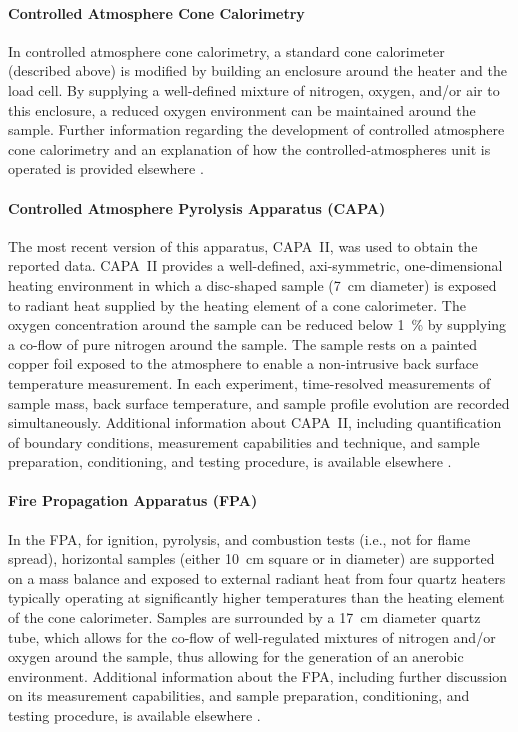 \documentclass{book}
\begin{document}
\paragraph{Controlled Atmosphere Cone Calorimetry}

In controlled atmosphere cone calorimetry, a standard cone calorimeter (described above) is modified by building an enclosure around the heater and the load cell. By supplying a well-defined mixture of nitrogen, oxygen, and/or air to this enclosure, a reduced oxygen environment can be maintained around the sample. Further information regarding the development of controlled atmosphere cone calorimetry and an explanation of how the controlled‐atmospheres unit is operated is provided elsewhere \cite{babrauskas1992cone}.

\paragraph{Controlled Atmosphere Pyrolysis Apparatus (CAPA)}

The most recent version of this apparatus, CAPA~II, was used to obtain the reported data. CAPA~II provides a well-defined, axi-symmetric, one-dimensional heating environment in which a disc-shaped sample (7~cm diameter) is exposed to radiant heat supplied by the heating element of a cone calorimeter. The oxygen concentration around the sample can be reduced below 1~\% by supplying a co-flow of pure nitrogen around the sample. The sample rests on a painted copper foil exposed to the atmosphere to enable a non-intrusive back surface temperature measurement. In each experiment, time-resolved measurements of sample mass, back surface temperature, and sample profile evolution are recorded simultaneously. Additional information about CAPA~II, including quantification of boundary conditions, measurement capabilities and technique, and sample preparation, conditioning, and testing procedure, is available elsewhere \cite{swann2017controlled}.

\paragraph{Fire Propagation Apparatus (FPA)}

In the FPA, for ignition, pyrolysis, and combustion tests (i.e., not for flame spread), horizontal samples (either 10~cm square or in diameter) are supported on a mass balance and exposed to external radiant heat from four quartz heaters typically operating at significantly higher temperatures than the heating element of the cone calorimeter. Samples are surrounded by a 17~cm diameter quartz tube, which allows for the co-flow of well-regulated mixtures of nitrogen and/or oxygen around the sample, thus allowing for the generation of an anerobic environment. Additional information about the FPA, including further discussion on its measurement capabilities, and sample preparation, conditioning, and testing procedure, is available elsewhere \cite{astm2058standard}.
\end{document}
